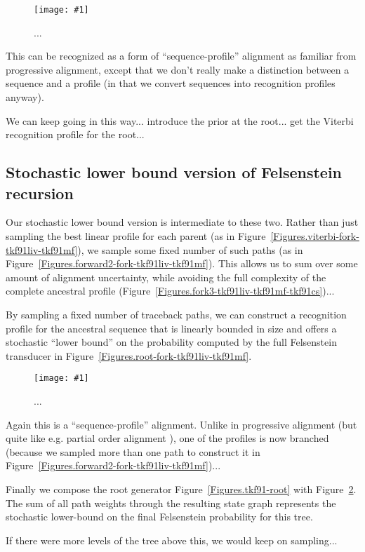 \documentclass{article}
\newcommand{\figref}[1]{Figure~\ref{Figures.#1}}
\newcommand{\figlabel}[1]{\label{Figures.#1}}
\newcommand{\easyfig}[4]{
\begin{figure}
\texttt{[image: \#1]}
\caption{ \figlabel{#3} #4}
\end{figure}}
\newcommand{\widepngfig}[2]{\easyfig{#1.png}{width=\textwidth}{#1}{#2}}
\newcommand{\widepdffig}[2]{\easyfig{#1-fig.pdf}{width=\textwidth}{#1}{#2}}
\newcommand{\needfig}[1]{{\bf Need figure: } #1 }
\begin{document}
\widepdffig{fork-tkf91viterbi-tkf91cs}{...}

This can be recognized as a form of ``sequence-profile'' alignment as familiar from progressive alignment,
except that we don't really make a distinction between a sequence and a profile
(in that we convert sequences into recognition profiles anyway).

We can keep going in this way...
introduce the prior at the root...
get the Viterbi recognition profile for the root...

\subsection{Stochastic lower bound version of Felsenstein recursion}

Our stochastic lower bound version is intermediate to these two.
Rather than just sampling the best linear profile for each parent
(as in \figref{viterbi-fork-tkf91liv-tkf91mf}),
we sample some fixed number of such paths
(as in \figref{forward2-fork-tkf91liv-tkf91mf}).
This allows us to sum over some amount of alignment uncertainty,
while avoiding the full complexity of the complete ancestral profile
(\figref{fork3-tkf91liv-tkf91mf-tkf91cs})...

By sampling a fixed number of traceback paths,
we can construct a recognition profile for the ancestral sequence
that is linearly bounded in size and offers a stochastic ``lower bound''
on the probability computed by the full Felsenstein transducer in \figref{root-fork-tkf91liv-tkf91mf}.

\widepngfig{fork-tkf91forward2-tkf91cs}{...}

Again this is a ``sequence-profile'' alignment.
Unlike in progressive alignment
 (but quite like e.g. partial order alignment \cite{LeeGrassoSharlow2002}),
one of the profiles is now branched
 (because we sampled more than one path to construct it in \figref{forward2-fork-tkf91liv-tkf91mf})...


Finally we compose the root generator \figref{tkf91-root}
with \figref{fork-tkf91forward2-tkf91cs}.
The sum of all path weights through the resulting state graph represents the stochastic lower-bound
on the final Felsenstein probability for this tree.

If there were more levels of the tree above this, we would keep on sampling...
\end{document}

